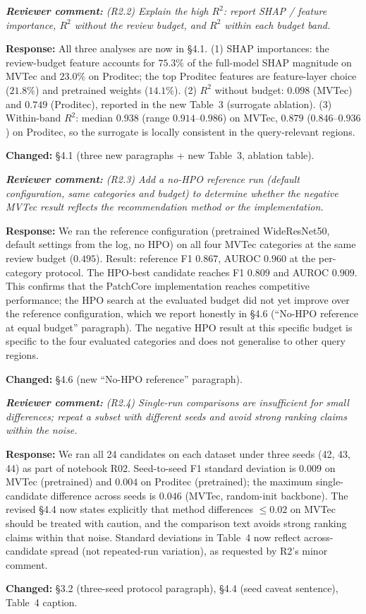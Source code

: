 \documentclass[11pt,a4paper]{article}
\newcommand{\revquote}[1]{\smallskip\noindent\textit{\textbf{Reviewer comment:} #1}\smallskip}
\newcommand{\response}[1]{\noindent\textbf{Response:} #1\par}
\begin{document}
\revquote{(R2.2) Explain the high $R^2$: report SHAP / feature importance,
$R^2$ without the review budget, and $R^2$ within each budget band.}

\response{All three analyses are now in \S4.1.
(1) SHAP importances: the review-budget feature accounts for $75.3\%$
of the full-model SHAP magnitude on MVTec and $23.0\%$ on Proditec;
the top Proditec features are feature-layer choice ($21.8\%$) and
pretrained weights ($14.1\%$).
(2) $R^2$ without budget: $0.098$ (MVTec) and $0.749$ (Proditec),
reported in the new Table~3 (surrogate ablation).
(3) Within-band $R^2$: median $0.938$ (range $0.914$--$0.986$) on
MVTec, $0.879$ ($0.846$--$0.936$) on Proditec, so the surrogate is
locally consistent in the query-relevant regions.

\noindent\textbf{Changed:} \S4.1 (three new paragraphs + new
Table~3, ablation table).}

\bigskip

\revquote{(R2.3) Add a no-HPO reference run (default configuration, same
categories and budget) to determine whether the negative MVTec result
reflects the recommendation method or the implementation.}

\response{We ran the reference configuration (pretrained WideResNet50,
default settings from the log, no HPO) on all four MVTec categories at
the same review budget ($0.495$). Result: reference F1 $0.867$, AUROC
$0.960$ at the per-category protocol. The HPO-best candidate reaches
F1 $0.809$ and AUROC $0.909$. This confirms that the PatchCore
implementation reaches competitive performance; the HPO search at the
evaluated budget did not yet improve over the reference configuration,
which we report honestly in \S4.6 (``No-HPO reference at equal budget''
paragraph). The negative HPO result at this specific budget is
specific to the four evaluated categories and does not generalise to
other query regions.

\noindent\textbf{Changed:} \S4.6 (new ``No-HPO reference'' paragraph).}

\bigskip

\revquote{(R2.4) Single-run comparisons are insufficient for small
differences; repeat a subset with different seeds and avoid strong
ranking claims within the noise.}

\response{We ran all 24 candidates on each dataset under three seeds
(42, 43, 44) as part of notebook R02. Seed-to-seed F1 standard
deviation is $0.009$ on MVTec (pretrained) and $0.004$ on Proditec
(pretrained); the maximum single-candidate difference across seeds is
$0.046$ (MVTec, random-init backbone). The revised \S4.4 now states
explicitly that method differences $\leq 0.02$ on MVTec should be
treated with caution, and the comparison text avoids strong ranking
claims within that noise. Standard deviations in Table~4 now reflect
across-candidate spread (not repeated-run variation), as requested by
R2's minor comment.

\noindent\textbf{Changed:} \S3.2 (three-seed protocol paragraph), \S4.4
(seed caveat sentence), Table~4 caption.}
\end{document}
